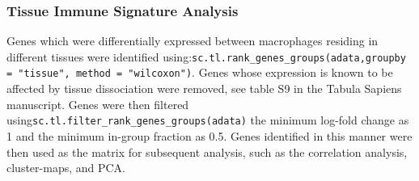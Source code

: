 \subsubsection{Tissue Immune Signature Analysis}
Genes which were differentially expressed between macrophages residing in different tissues
were identified using:\newline \verb|sc.tl.rank_genes_groups(adata,groupby = "tissue", method = "wilcoxon")|.
Genes whose expression is known to be affected by tissue dissociation were removed, see table S9 in the Tabula Sapiens manuscript\cite{tabula_sapiens_consortium_tabula_2022}. Genes were then filtered using\newline\verb|sc.tl.filter_rank_genes_groups(adata)|\newline
the minimum log-fold change as 1 and the minimum in-group fraction as 0.5. Genes identified in this manner were then used as the matrix for subsequent analysis, such as the correlation analysis, cluster-maps, and PCA.